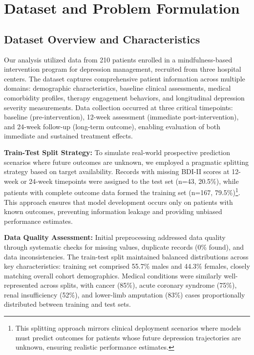 \documentclass[conference]{IEEEtran}
\begin{document}
\section{Dataset and Problem Formulation}

\subsection{Dataset Overview and Characteristics}

Our analysis utilized data from 210 patients enrolled in a mindfulness-based intervention program for depression management, recruited from three hospital centers. The dataset captures comprehensive patient information across multiple domains: demographic characteristics, baseline clinical assessments, medical comorbidity profiles, therapy engagement behaviors, and longitudinal depression severity measurements. Data collection occurred at three critical timepoints: baseline (pre-intervention), 12-week assessment (immediate post-intervention), and 24-week follow-up (long-term outcome), enabling evaluation of both immediate and sustained treatment effects.

\textbf{Train-Test Split Strategy:} To simulate real-world prospective prediction scenarios where future outcomes are unknown, we employed a pragmatic splitting strategy based on target availability. Records with missing BDI-II scores at 12-week or 24-week timepoints were assigned to the test set (n=43, 20.5\%), while patients with complete outcome data formed the training set (n=167, 79.5\%)\footnote{This splitting approach mirrors clinical deployment scenarios where models must predict outcomes for patients whose future depression trajectories are unknown, ensuring realistic performance estimates.}. This approach ensures that model development occurs only on patients with known outcomes, preventing information leakage and providing unbiased performance estimates.

\textbf{Data Quality Assessment:} Initial preprocessing addressed data quality through systematic checks for missing values, duplicate records (0\% found), and data inconsistencies. The train-test split maintained balanced distributions across key characteristics: training set comprised 55.7\% males and 44.3\% females, closely matching overall cohort demographics. Medical conditions were similarly well-represented across splits, with cancer (85\%), acute coronary syndrome (75\%), renal insufficiency (52\%), and lower-limb amputation (83\%) cases proportionally distributed between training and test sets.
\end{document}
